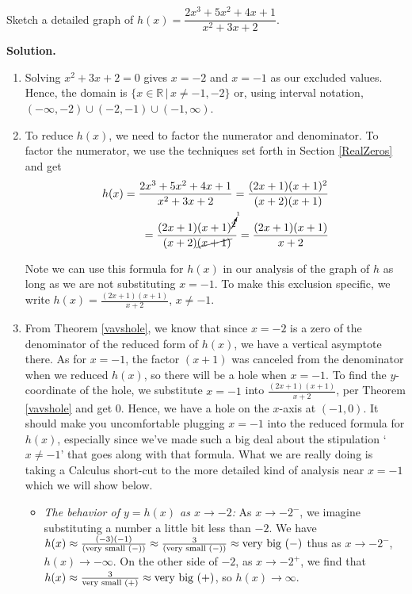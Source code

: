 \begin{ex}  Sketch a detailed graph of $h(x) = \dfrac{2x^3+5x^2+4x+1}{x^2+3x+2}$.

{ \bf Solution.}  

\begin{enumerate}

\item   Solving $x^2+3x+2 = 0$ gives $x = -2$ and $x=-1$ as our excluded values.  Hence, the domain is $\{ x \in \mathbb{R} \, | \, x \neq -1, -2 \}$ or, using interval notation,  $(-\infty, -2) \cup (-2, -1) \cup (-1, \infty)$.

\item  To reduce $h(x)$, we need to factor the numerator and denominator.  To factor the numerator, we use the techniques set forth in Section \ref{RealZeros} and get
\begin{align*}
h(x) =  \dfrac{2x^3+5x^2+4x+1}{x^2+3x+2} = \dfrac{(2x+1)(x+1)^2}{(x+2)(x+1)}\\
= \dfrac{ (2x+1) (x+1)^{\cancelto{1}{2}}  }{(x+2)\cancel{(x+1)}} = \dfrac{(2x+1)(x+1)}{x+2}
\end{align*}

Note we can use this formula for $h(x)$ in our analysis of the graph of $h$ as long as we are not substituting $x=-1$.  To make this exclusion specific, we write $h(x) = \frac{(2x+1)(x+1)}{x+2}$, $x \neq -1$.

\item  From Theorem \ref{vavshole}, we know that since $x=-2$ is a zero of the denominator of the reduced form of $h(x)$, we have a vertical asymptote there.  As for $x=-1$, the factor $(x+1)$ was canceled from the denominator when we reduced $h(x)$, so there will be a hole when $x=-1$.  To find the $y$-coordinate of the hole, we substitute $x=-1$ into $\frac{(2x+1)(x+1)}{x+2}$, per Theorem \ref{vavshole} and get $0$.  Hence, we have a hole on the $x$-axis at $(-1,0)$.  It should make you uncomfortable plugging $x=-1$ into the reduced formula for $h(x)$, especially since we've made such a big deal about the stipulation  `$x \neq -1$' that goes along with that formula.  What we are really doing is taking a Calculus short-cut to the more detailed kind of analysis near $x=-1$ which we will show below. 
\begin{itemize}

\item  \textit{The behavior of $y=h(x)$ as $x \rightarrow -2$:}  As $x \rightarrow -2^{-}$, we imagine substituting a number a little bit less than $-2$. We have $h(x) \approx \frac{(-3)(-1)}{(\text{\scriptsize very small $(-)$})} \approx \frac{3}{(\text{\scriptsize very small $(-)$})}\approx \text{very big $(-)$}$ thus as $x \rightarrow -2^{-}$, $h(x) \rightarrow -\infty$. On the other side of $-2$, as $x \rightarrow -2^{+}$, we find that $h(x) \approx \frac{3}{\text{\scriptsize very small $(+)$}} \approx \text{very big $(+)$}$, so $h(x) \rightarrow \infty$.


\end{itemize}
\end{enumerate}
\end{ex}
